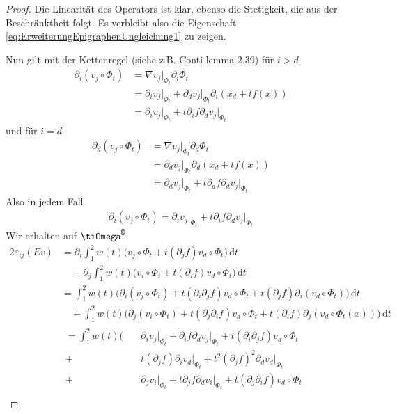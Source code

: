 \documentclass{scrartcl}
\def\e{\varepsilon}
\newcommand{\dif}[1]{\,\mathrm{d} #1}
\begin{document}
\begin{proof}
	Die Linearität des Operators ist klar, ebenso die Stetigkeit, die aus der Beschränktheit folgt. Es verbleibt also die Eigenschaft \eqref{eq:ErweiterungEpigraphenUngleichung1} zu zeigen.
	
	Nun gilt mit der Kettenregel (siehe z.B. Conti lemma 2.39) für $i>d$
	\begin{align*}
		\partial_i(v_j\circ\Phi_t)
		&= \nabla v_j\big\vert_{\Phi_t} \partial_i\Phi_t \\
		&= \partial_iv_j\big\vert_{\Phi_t}+\partial_dv_j\big\vert_{\Phi_t}\partial_i(x_d+tf(x)) \\
		&= \partial_iv_j\big\vert_{\Phi_t}+t\partial_if\partial_dv_j\big\vert_{\Phi_t}
	\end{align*}
	und für $i=d$
	\begin{align*}
		\partial_d(v_j\circ\Phi_t)
		&= \nabla v_j\big\vert_{\Phi_t} \partial_d\Phi_t \\
		&= \partial_dv_j\big\vert_{\Phi_t}\partial_d(x_d+tf(x)) \\
		&= \partial_dv_j\big\vert_{\Phi_t}+t\partial_df\partial_dv_j\big\vert_{\Phi_t}
	\end{align*}
	Also in jedem Fall
	\begin{align*}
		\partial_i(v_j\circ\Phi_t) = \partial_iv_j\big\vert_{\Phi_t}+t\partial_if\partial_dv_j\big\vert_{\Phi_t}
	\end{align*}
	Wir erhalten auf $\tiOmega^\complement$
	\begin{align*}
		2\e_{ij}(Ev)
		&= \partial_i\int_1^2w(t)\big(v_j\circ\Phi_t+t(\partial_jf)v_d\circ\Phi_t\big)\dif t \\
		&\quad+\partial_j\int_1^2w(t)\big(v_i\circ\Phi_t+t(\partial_if)v_d\circ\Phi_t\big)\dif t \\
		&= \int_1^2w(t)\big(\partial_i(v_j\circ\Phi_t)+t(\partial_i\partial_jf)v_d\circ\Phi_t+t(\partial_jf)\partial_i(v_d\circ\Phi_t)\big)\dif t \\
		&\quad+\int_1^2w(t)\big(\partial_j(v_i\circ\Phi_t)+t(\partial_j\partial_if)v_d\circ\Phi_t+t(\partial_if)\partial_j(v_d\circ\Phi_t(x))\big)\dif t \\
		&\begin{aligned}=\int_1^2w(t)\Big(\quad&\partial_iv_j\big\vert_{\Phi_t}+\partial_if\partial_dv_j\big\vert_{\Phi_t}+t(\partial_i\partial_jf)v_d\circ\Phi_t & \\
		+&t(\partial_jf)\partial_iv_d\big\vert_{\Phi_t}+t^2(\partial_jf)^2\partial_dv_d\big\vert_{\Phi_t} & \\
		+&\partial_jv_i\big\vert_{\Phi_t}+t\partial_jf\partial_dv_i\big\vert_{\Phi_t}+t(\partial_j\partial_if)v_d\circ\Phi_t & \\

\end{aligned}
\end{align*}
\end{proof}
\end{document}

